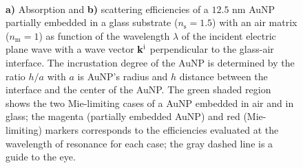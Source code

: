 

\begin{figure}[b!]
    \hspace*{-21em}%
    \vspace*{-1.25em}%
        \begin{subfigure}{.715\textwidth}\caption{ }\label{sfig:IncNormal:1}\end{subfigure}%
        \begin{subfigure}{.25\textwidth}\caption{ }\label{sfig:IncNormal:2}\end{subfigure} \\
    \def\svgwidth{.95\textwidth}
    \small
    \centering
    \vspace*{0em}
    \caption[Absorption and Scattering Efficiencies of a partially embedded 12.5 nm AuNP into a substrate Illuminated in an internal configuration at normal incidence]{\textbf{a)} Absorption and \textbf{b)} scattering efficiencies of a $12.5$ nm AuNP partially embedded in a glass substrate ($n_\text{s} = 1.5$) with an air matrix ($n_\text{m} = 1$) as function of the wavelength $\lambda$ of the incident electric plane wave with a wave vector $\vb{k}^\text{i}$ perpendicular to the glass-air interface. The incrustation degree of the AuNP is determined by the ratio $h/a$ with $a$ is AuNP's radius and $h$ distance between the interface and the center of the AuNP. The green shaded region shows the two Mie-limiting cases of a AuNP embedded in air and in glass; the magenta (partially embedded AuNP) and red (Mie-limiting) markers corresponds to the efficiencies evaluated at the wavelength of resonance for each case; the gray dashed line is a guide to the eye.}
    \label{fig:Inc:Eff}
\label{fig:IncNormal}
\end{figure}




